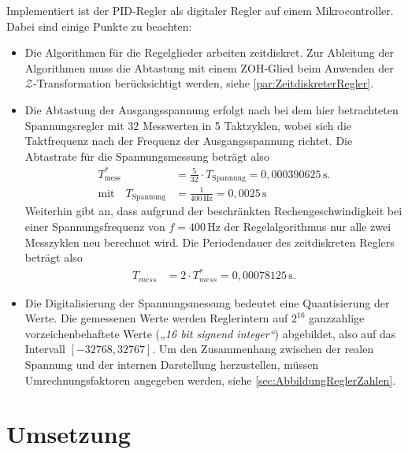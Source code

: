 Implementiert ist der PID-Regler als digitaler Regler auf einem Mikrocontroller. Dabei sind einige Punkte zu beachten:
\begin{itemize}
    \item {Die Algorithmen für die Regelglieder arbeiten zeitdiskret. Zur Ableitung der Algorithmen muss die Abtastung mit einem ZOH-Glied beim Anwenden der $\mathcal{Z}$-Transformation berücksichtigt werden, siehe \cref{par:ZeitdiskreterRegler}.}
    \item {Die Abtastung der Ausgangsspannung erfolgt nach \cite{pillerpowersystemsDigitalerSpannungsreglerSoftwaredokumentation1997} bei dem hier betrachteten Spannungsregler mit 32 Messwerten in 5 Taktzyklen, wobei sich die Taktfrequenz nach der Frequenz der Ausgangsspannung richtet. Die Abtastrate für die Spannungsmessung beträgt also
    \begin{align}
        T_{\mathrm{mess}}^*&= \frac{5}{32}\cdot T_{\mathrm{Spannung}} = 0,000390625\,\mathrm s. \\
        \text{mit} \quad
        T_{\mathrm{Spannung}}&= \frac{1}{400\,\mathrm{Hz}}=0,0025\,\mathrm s
    \end{align}
    Weiterhin gibt \cite{pillerpowersystemsDigitalerSpannungsreglerSoftwaredokumentation1997} an, dass aufgrund der beschränkten Rechengeschwindigkeit bei einer Spannungsfrequenz von \(f=400\,\mathrm{Hz}\) der Regelalgorithmus nur alle zwei Messzyklen neu berechnet wird. Die Periodendauer des zeitdiskreten Reglers beträgt also
    \begin{align}
        T_{mess}&=2\cdot T_{mess}^*= 0,00078125\,\mathrm s. \label{eq:PeriodendauerRegler}
    \end{align} }
    \item {Die Digitalisierung der Spannungsmessung bedeutet eine Quantisierung der Werte. Die gemessenen Werte werden Reglerintern auf \(2^{16}\) ganzzahlige vorzeichenbehaftete Werte (\emph{„16 bit signend integer“}) abgebildet, also auf das Intervall \([-32768,32767]\). Um den Zusammenhang zwischen der realen Spannung und der internen Darstellung herzustellen, müssen Umrechnungsfaktoren angegeben werden, siehe \cref{sec:AbbildungReglerZahlen}.}
\end{itemize}


\section{Umsetzung}\label{sec:umsetzung}

